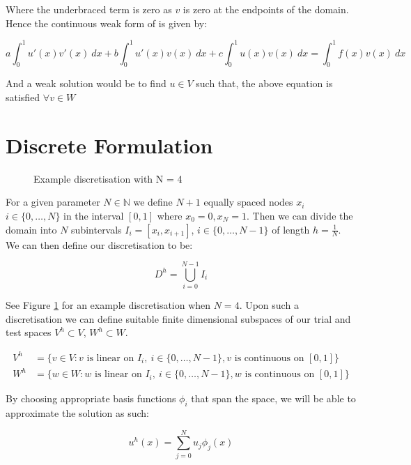 Where the underbraced term is zero as $v$ is zero at the endpoints of the
domain. Hence the continuous weak form of  is given
by:

\begin{equation}\label{eq:wk-oned-deterministic}
    a\int_0^1{u'(x)v'(x)\ dx} + b\int_0^1{u'(x)v(x)\ dx}
    + c\int_0^1{u(x)v(x)\ dx} = \int_0^1{f(x)v(x)\ dx}
\end{equation}

And a weak solution would be to find $u \in V$ such that, the above equation is
satisfied $\forall v \in W$

\section{Discrete Formulation}

\begin{figure}
\centering

\caption{Example discretisation with N = 4}
\label{fig:one-d-discretisation}
\end{figure}

For a given parameter $N \in \mathbb{N}$ we define $N+1$ equally spaced nodes
$x_i$ $i \in \{0, \ldots, N\}$ in the interval $[0,1]$ where
$x_0 = 0, x_N = 1$. Then we can divide the domain into $N$ subintervals
$ I_i = [x_i, x_{i+1}]$, $i \in \{0,\ldots,N - 1\}$ of length $h = \frac{1}{N}$.
We can then define our discretisation to be:

\[
    D^h = \bigcup_{i=0}^{N - 1} I_i
\]

See Figure \ref{fig:one-d-discretisation} for an example discretisation
when $N=4$.  Upon such a discretisation we can define suitable finite
dimensional subspaces of our trial and test spaces $V^h \subset V$, $W^h
\subset W$.

\begin{align*}
    V^h &= \{v \in V: v \text{ is linear on } I_i,
          \ i \in \{0, \ldots, N - 1\},
          v \text{ is continuous on } [0, 1]\} \\
    W^h &= \{w \in W: w \text{ is linear on } I_i,
          \ i \in \{0, \ldots, N - 1\},
          w \text{ is continuous on } [0, 1]\}
\end{align*}

By choosing appropriate basis functions $\phi_i$ that span the space, we will
be able to approximate the solution as such:

\begin{equation}\label{eq:one-d-approx-soln}
    u^h(x) = \sum_{j = 0}^N{u_j\phi_j(x)}
\end{equation}

